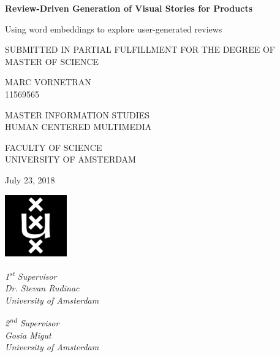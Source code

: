 \begin{titlepage}
    \begin{center}
    
        \Huge
        \textbf{Review-Driven Generation of Visual Stories for Products}
        
        \vspace{0.5cm}
        \LARGE
        Using word embeddings to explore user-generated reviews
        
        \vspace{1.5cm}
        
        SUBMITTED IN PARTIAL FULFILLMENT FOR THE DEGREE OF\\
        MASTER OF SCIENCE
        
        \vspace{1cm}
        
        MARC VORNETRAN\\
        11569565
        
        \vspace{1.5cm}
        
        MASTER INFORMATION STUDIES\\
        HUMAN CENTERED MULTIMEDIA
        
        \vspace{1cm}
        
        FACULTY OF SCIENCE\\
        UNIVERSITY OF AMSTERDAM
        
        \vspace{1.5cm}
        
        July 23, 2018
        
        \vspace{1.5cm}
        
        \includegraphics[width=0.2\textwidth]{assets/uva.png}
        
        \vfill
        
        \begin{minipage}[t]{0.68\textwidth}
            \textit{1\textsuperscript{st} Supervisor}\\
            \textit{Dr. Stevan Rudinac}\\
            \textit{University of Amsterdam}
        \end{minipage}
        \hfill
        \begin{minipage}[t]{0.28\textwidth}
            \textit{2\textsuperscript{nd} Supervisor}\\
            \textit{Gosia Migut}\\
            \textit{University of Amsterdam}
        \end{minipage}
        
    \end{center}
\end{titlepage}